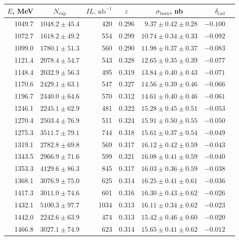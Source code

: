 \begin{tabular}{r r r r r r r}
  $E$, MeV & \multicolumn{1}{c}{$N_\text{exp}$} & \multicolumn{1}{c}{$IL\text{, nb}^{-1}$} & \multicolumn{1}{c}{$\varepsilon$} & \multicolumn{1}{c}{$\sigma_\text{born}$, nb} & $\delta_\text{rad}$ \\ \hline
  1049.7 & $1048.2 \pm  45.4$ &   420 & 0.296 & $  9.37 \pm 0.42 \pm 0.28$ & $ -0.100$ \\
  1072.7 & $1618.2 \pm  49.2$ &   554 & 0.299 & $ 10.74 \pm 0.34 \pm 0.33$ & $ -0.092$ \\
  1099.0 & $1780.1 \pm  51.3$ &   560 & 0.290 & $ 11.98 \pm 0.37 \pm 0.37$ & $ -0.083$ \\
  1121.4 & $2078.4 \pm  54.7$ &   543 & 0.328 & $ 12.65 \pm 0.35 \pm 0.39$ & $ -0.077$ \\
  1148.4 & $2032.9 \pm  56.3$ &   495 & 0.319 & $ 13.84 \pm 0.40 \pm 0.43$ & $ -0.071$ \\
  1170.6 & $2429.1 \pm  63.1$ &   547 & 0.327 & $ 14.56 \pm 0.39 \pm 0.46$ & $ -0.066$ \\
  1196.7 & $2440.0 \pm  64.6$ &   570 & 0.312 & $ 14.61 \pm 0.40 \pm 0.46$ & $ -0.061$ \\
  1246.1 & $2245.1 \pm  62.9$ &   481 & 0.322 & $ 15.28 \pm 0.45 \pm 0.51$ & $ -0.053$ \\
  1270.4 & $2503.4 \pm  76.9$ &   511 & 0.324 & $ 15.91 \pm 0.50 \pm 0.55$ & $ -0.050$ \\
  1275.3 & $3511.7 \pm  79.1$ &   744 & 0.318 & $ 15.61 \pm 0.37 \pm 0.54$ & $ -0.049$ \\
  1319.1 & $2782.8 \pm  69.8$ &   569 & 0.317 & $ 16.12 \pm 0.42 \pm 0.59$ & $ -0.043$ \\
  1343.5 & $2966.9 \pm  71.6$ &   599 & 0.321 & $ 16.08 \pm 0.41 \pm 0.59$ & $ -0.040$ \\
  1353.3 & $4129.6 \pm  86.3$ &   845 & 0.317 & $ 16.03 \pm 0.36 \pm 0.59$ & $ -0.038$ \\
  1368.1 & $3076.9 \pm  75.0$ &   625 & 0.314 & $ 16.25 \pm 0.41 \pm 0.61$ & $ -0.036$ \\
  1417.3 & $3011.0 \pm  74.6$ &   601 & 0.316 & $ 16.30 \pm 0.43 \pm 0.62$ & $ -0.026$ \\
  1432.1 & $5100.3 \pm  97.7$ &  1034 & 0.313 & $ 16.11 \pm 0.34 \pm 0.62$ & $ -0.023$ \\
  1442.0 & $2242.6 \pm  63.9$ &   474 & 0.313 & $ 15.42 \pm 0.46 \pm 0.60$ & $ -0.020$ \\
  1466.8 & $3027.1 \pm  74.9$ &   623 & 0.314 & $ 15.65 \pm 0.41 \pm 0.62$ & $ -0.012$ \\

\end{tabular}
